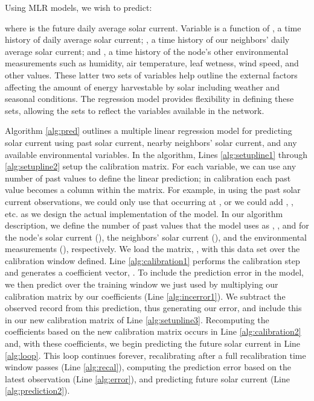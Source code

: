 \documentclass[prodmode,acmtosn]{acmsmall}
\begin{document}
Using MLR models, we wish to predict:

where  is the future daily average solar current.
Variable  is a function of , a time history of daily average solar current; , a time history of our neighbors' daily average solar current; and , a time history of the node's other environmental measurements such as humidity, air temperature, leaf wetness, wind speed, and other values.
These latter two sets of variables help outline the external factors affecting the amount of energy harvestable by solar including weather and seasonal conditions.
The regression model provides flexibility in defining these sets, allowing the sets to reflect the variables available in the network.

Algorithm \ref{alg:pred} outlines a multiple linear regression model for predicting solar current using past solar current, nearby neighbors' solar current, and any available environmental variables.
In the algorithm, Lines \ref{alg:setupline1} through \ref{alg:setupline2} setup the calibration matrix.
For each variable, we can use any number of past values to define the linear prediction; in calibration each past value becomes a column within the matrix.
For example, in using the past solar current observations, we could only use that occurring at , or we could add , , etc. as we design the actual implementation of the model.
In our algorithm description, we define the number of past values that the model uses as , , and  for the node's solar current (), the neighbors' solar current (), and the environmental measurements (), respectively.
We load the matrix, , with this data set over the calibration window defined.
Line \ref{alg:calibration1} performs the calibration step and generates a coefficient vector, .
To include the prediction error in the model, we then predict over the training window we just used by multiplying our calibration matrix by our coefficients (Line \ref{alg:incerror1}).
We subtract the observed record from this prediction, thus generating our error, and include this in our new calibration matrix of Line \ref{alg:setupline3}.
Recomputing the coefficients based on the new calibration matrix occurs in Line \ref{alg:calibration2} and, with these coefficients, we begin predicting the future solar current in Line \ref{alg:loop}.
This loop continues forever, recalibrating after a full recalibration time window passes (Line \ref{alg:recal}), computing the prediction error based on the latest observation (Line \ref{alg:error}), and predicting future solar current (Line \ref{alg:prediction2}).
\end{document}
